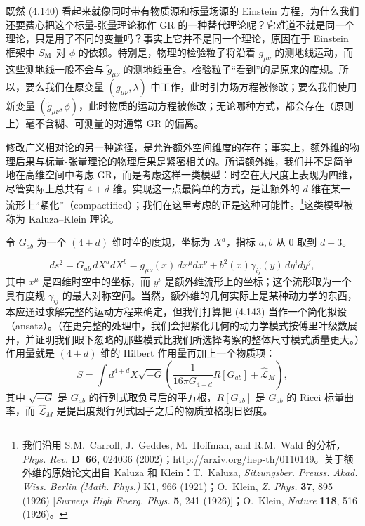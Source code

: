 既然 (4.140) 看起来就像同时带有物质源和标量场源的 Einstein 方程，为什么我们还要费心把这个标量-张量理论称作 GR 的一种替代理论呢？它难道不就是同一个理论，只是用了不同的变量吗？事实上它并不是同一个理论，原因在于 Einstein 框架中 $S_{\rm M}$ 对 $\phi$ 的依赖。特别是，物理的检验粒子将沿着 $g_{\mu\nu}$ 的测地线运动，而这些测地线一般不会与 $\widetilde{g}_{\mu\nu}$ 的测地线重合。检验粒子“看到”的是原来的度规。所以，要么我们在原变量 $(g_{\mu\nu}, \lambda)$ 中工作，此时引力场方程被修改；要么我们使用新变量 $(\widetilde{g}_{\mu\nu}, \phi)$，此时物质的运动方程被修改；无论哪种方式，都会存在（原则上）毫不含糊、可测量的对通常 GR 的偏离。

修改广义相对论的另一种途径，是允许额外空间维度的存在；事实上，额外维的物理后果与标量-张量理论的物理后果是紧密相关的。所谓额外维，我们并不是简单地在高维空间中考虑 GR，而是考虑这样一类模型：时空在大尺度上表现为四维，尽管实际上总共有 $4 + d$ 维。实现这一点最简单的方式，是让额外的 $d$ 维在某一流形上“紧化”（compactified）；我们在这里考虑的正是这种可能性。\footnote{我们沿用 S.M.~Carroll, J.~Geddes, M.~Hoffman, and R.M.~Wald 的分析，\emph{Phys. Rev.} \textbf{D~66}, 024036 (2002)；http://arxiv.org/hep-th/0110149。关于额外维的原始论文出自 Kaluza 和 Klein：T.~Kaluza, \emph{Sitzungsber. Preuss. Akad. Wiss. Berlin (Math. Phys.)} K1, 966 (1921)；O.~Klein, \emph{Z. Phys.} \textbf{37}, 895 (1926) [\emph{Surveys High Energ. Phys.} \textbf{5}, 241 (1926)]；O.~Klein, \emph{Nature} \textbf{118}, 516 (1926)。}这类模型被称为 Kaluza–Klein 理论。

令 $G_{ab}$ 为一个 $(4 + d)$ 维时空的度规，坐标为 $X^a$，指标 $a, b$ 从 0 取到 $d + 3$。

\begin{equation*}
ds^{2} = G_{ab}\,dX^{a}dX^{b} = g_{\mu\nu}(x)\,dx^{\mu}dx^{\nu} + b^{2}(x)\gamma_{ij}(y)\,dy^{i}dy^{j},
\tag{4.143}
\end{equation*}
其中 $x^{\mu}$ 是四维时空中的坐标，而 $y^{i}$ 是额外维流形上的坐标；这个流形取为一个具有度规 $\gamma_{ij}$ 的最大对称空间。当然，额外维的几何实际上是某种动力学的东西，本应通过求解完整的运动方程来确定，但我们打算把 (4.143) 当作一个简化拟设（ansatz）。（在更完整的处理中，我们会把紧化几何的动力学模式按傅里叶级数展开，并证明我们眼下忽略的那些模式比我们所选择考察的整体尺寸模式质量更大。）作用量就是 $(4+d)$ 维的 Hilbert 作用量再加上一个物质项：
\begin{equation*}
S = \int d^{4+d}X\sqrt{-G}\left(\frac{1}{16\pi G_{4+d}}R[G_{ab}] + \widehat{\mathcal{L}}_M\right),
\tag{4.144}
\end{equation*}
其中 $\sqrt{-G}$ 是 $G_{ab}$ 的行列式取负号后的平方根，$R[G_{ab}]$ 是 $G_{ab}$ 的 Ricci 标量曲率，而 $\widehat{\mathcal{L}}_M$ 是提出度规行列式因子之后的物质拉格朗日密度。

